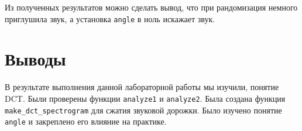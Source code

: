 \documentclass[a4paper, 14pt]{extarticle}
\begin{document}
    Из полученных результатов можно сделать вывод, что при рандомизация немного приглушила звук, а установка \texttt{angle} в ноль искажает звук.

    \newpage



    \section{Выводы}
    \label{sec:conclusions}

    В результате выполнения данной лабораторной работы мы изучили, понятие DCT.
    Были проверены функции \texttt{analyze1} и \texttt{analyze2}.
    Была создана функция \texttt{make\_dct\_spectrogram} для сжатия звуковой дорожки.
    Было изучено понятие \texttt{angle} и закреплено его влияние на практике.
\end{document}
